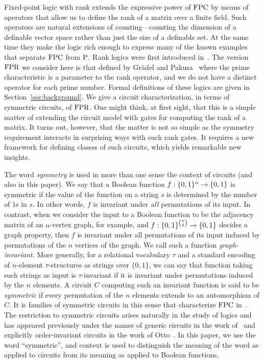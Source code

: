 \documentclass[a4paper,UKenglish]{lipics-v2018}
\begin{document}
Fixed-point logic with rank extends the expressive power of $\text{\upshape FPC}$ by means of
operators that allow us to define the rank of a matrix over a finite field. Such
operators are natural extensions of counting---counting the dimension of a
definable vector space rather than just the size of a definable set. At the same
time they make the logic rich enough to express many of the known examples that
separate $\text{\upshape FPC}$ from $\mathrm{P}$. Rank logics were first introduced
in~\cite{Dawar09logicswith}. The version $\text{\upshape FPR}$ we consider here is that defined
by Gr\"adel and Pakusa~\cite{GradelP15a} where the prime characteristic is a
parameter to the rank operator, and we do not have a distinct operator for each
prime number. Formal definitions of these logics are given in
Section~\ref{sec:background}. We give a circuit characterization, in terms of
symmetric circuits, of $\text{\upshape FPR}$. One might think, at first sight, that this is a
simple matter of extending the circuit model with gates for computing the rank
of a matrix. It turns out, however, that the matter is not so simple as the
symmetry requirement interacts in surprising ways with such rank gates. It
requires a new framework for defining classes of such circuits, which yields
remarkable new insights.

The word \emph{symmetry} is used in more than one sense the context of circuits
(and also in this paper). We say that a Boolean function $f:\{0,1\}^n \rightarrow
\{0,1\}$ is symmetric if the value of the function on a string $s$ is determined
by the number of $1$s in $s$. In other words, $f$ is invariant under \emph{all}
permutations of its input. In contrast, when we consider the input to a Boolean
function to be the adjacency matrix of an $n$-vertex graph, for example, and $f
: \{0,1\}^{n \choose 2} \rightarrow \{0,1\}$ decides a graph property, then $f$ is
invariant under all permutations of its input induced by permutations of the $n$
vertices of the graph. We call such a function \emph{graph-invariant}. More
generally, for a relational vocabulary $\tau$ and a standard encoding of
$n$-element $\tau$-structures as strings over $\{0,1\}$, we can say that
function taking such strings as input is $\tau$-invariant if it is invariant
under permutations induced by the $n$ elements. A circuit $C$ computing such an
invariant function is said to be \emph{symmetric} if every permutation of the
$n$ elements extends to an automorphism of $C$. It is families of symmetric
circuits in this sense that characterize $\text{\upshape FPC}$ in~\cite{AndersonD17}. The
restriction to symmetric circuits arises naturally in the study of logics and
has appeared previously under the names of generic circuits in the work
of~\cite{DENENBERG1986216} and explicitly order-invariant circuits in the work
of Otto~\cite{Otto1997}. In this paper, we use the word ``symmetric'', and
context is used to distinguish the meaning of the word as applied to circuits
from its meaning as applied to Boolean functions.
\end{document}

